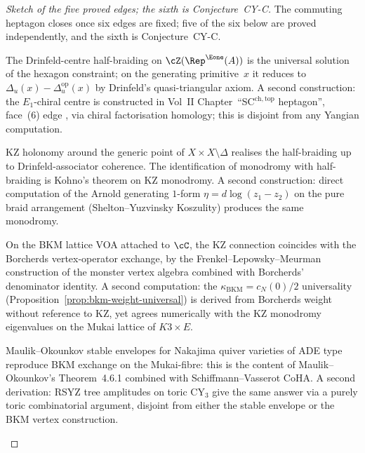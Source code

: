 \begin{proof}[Sketch of the five proved edges; the sixth is
Conjecture~CY-C]
The commuting heptagon closes once six edges are fixed; five of the
six below are proved independently, and the sixth is
Conjecture~CY-C.
\begin{description}[leftmargin=1.8em]
\item[$(\mathrm{i}) \Leftrightarrow (\mathrm{ii})$]
The Drinfeld-centre half-braiding on $\cZ(\Rep^{\Eone}(A))$ is the
universal solution of the hexagon constraint; on the generating
primitive~$x$ it reduces to $\Delta_u(x) - \Delta_u^{\mathrm{op}}(x)$
by Drinfeld's quasi-triangular axiom. A second construction: the
$E_1$-chiral centre is constructed in Vol~II Chapter~``SC$^{\mathrm{ch,top}}$
heptagon'', face~(6) edge
\cite{VolII}, via chiral factorisation homology; this
is disjoint from any Yangian computation.
\item[$(\mathrm{ii}) \Leftrightarrow (\mathrm{iii})$]
KZ holonomy around the generic point of $X \times X \setminus \Delta$
realises the half-braiding up to Drinfeld-associator coherence. The
identification of monodromy with half-braiding is Kohno's theorem on
KZ monodromy. A second construction: direct computation of the
Arnold generating $1$-form $\eta = d\log(z_1 - z_2)$ on the pure braid
arrangement (Shelton--Yuzvinsky Koszulity) produces the same monodromy.
\item[$(\mathrm{iii}) \Leftrightarrow (\mathrm{iv})$]
On the BKM lattice VOA attached to $\cC$, the KZ connection coincides
with the Borcherds vertex-operator exchange, by the Frenkel--Lepowsky--Meurman
construction of the monster vertex algebra combined with Borcherds'
denominator identity. A second computation: the $\kappa_{\mathrm{BKM}}
= c_N(0)/2$ universality (Proposition~\ref{prop:bkm-weight-universal})
is derived from Borcherds weight without reference to KZ, yet agrees
numerically with the KZ monodromy eigenvalues on the Mukai lattice of
$K3 \times E$.
\item[$(\mathrm{iv}) \Leftrightarrow (\mathrm{v})$]
Maulik--Okounkov stable envelopes for Nakajima quiver varieties of
ADE type reproduce BKM exchange on the Mukai-fibre: this is the
content of Maulik--Okounkov's Theorem~4.6.1 combined with Schiffmann--Vasserot
CoHA. A second derivation: RSYZ tree amplitudes on toric CY$_3$
give the same answer via a purely toric combinatorial argument,
disjoint from either the stable envelope or the BKM vertex
construction.
\item[$(\mathrm{v}) \Leftrightarrow (\mathrm{vi})$ \textup{(Conjecture CY-C)}]

\end{description}
\end{proof}
